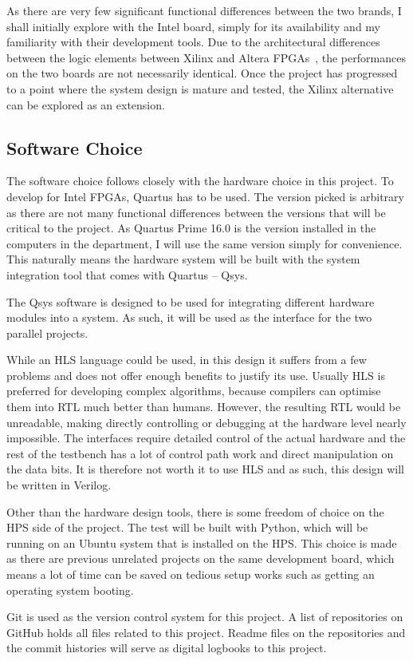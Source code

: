 As there are very few significant functional differences between the two brands, I shall initially explore with the Intel board, simply for its availability and my familiarity with their development tools.
Due to the architectural differences between the logic elements between Xilinx and Altera FPGAs~\cite{Scekic1}, the performances on the two boards are not necessarily identical.
Once the project has progressed to a point where the system design is mature and tested, the Xilinx alternative can be explored as an extension.

\subsection{Software Choice}
The software choice follows closely with the hardware choice in this project.
To develop for Intel FPGAs, Quartus has to be used.
The version picked is arbitrary as there are not many functional differences between the versions that will be critical to the project.
As Quartus Prime 16.0 is the version installed in the computers in the department, I will use the same version simply for convenience.
This naturally means the hardware system will be built with the system integration tool that comes with Quartus -- Qsys.

The Qsys software is designed to be used for integrating different hardware modules into a system.
As such, it will be used as the interface for the two parallel projects.

While an HLS language could be used, in this design it suffers from a few problems and does not offer enough benefits to justify its use.
Usually HLS is preferred for developing complex algorithms, because compilers can optimise them into RTL much better than humans.
However, the resulting RTL would be unreadable, making directly controlling or debugging at the hardware level nearly impossible.
The interfaces require detailed control of the actual hardware and the rest of the testbench has a lot of control path work and direct manipulation on the data bits.
It is therefore not worth it to use HLS and as such, this design will be written in Verilog.

Other than the hardware design tools, there is some freedom of choice on the HPS side of the project.
The test will be built with Python, which will be running on an Ubuntu system that is installed on the HPS.
This choice is made as there are previous unrelated projects on the same development board, which means a lot of time can be saved on tedious setup works such as getting an operating system booting.

Git is used as the version control system for this project.
A list of repositories on GitHub holds all files related to this project.
Readme files on the repositories and the commit histories will serve as digital logbooks to this project.
